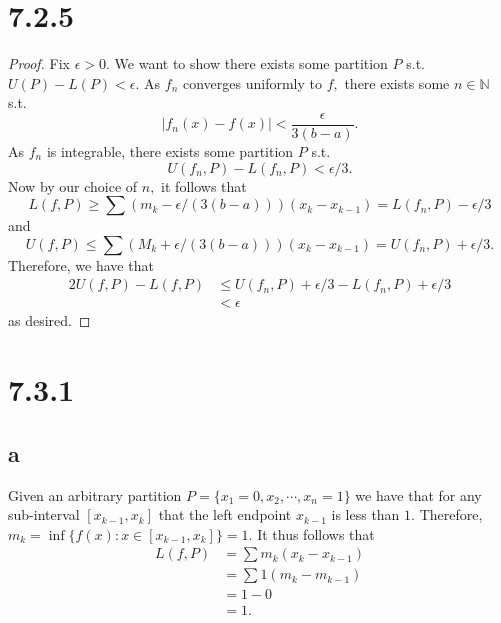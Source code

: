 \documentclass[10pt]{article}
\begin{document}
\section*{7.2.5}

\begin{proof}
    Fix $\epsilon > 0.$ We want to show there exists some partition $P$ s.t. $U(P)-L(P)<\epsilon.$ As $f_n$ converges uniformly to $f,$ there exists some $n\in\mathbb{N}$ s.t.
    \begin{equation*}
        |f_n(x)-f(x)|<\frac{\epsilon}{3(b-a)}.
    \end{equation*}
    As $f_n$ is integrable, there exists some partition $P$ s.t.
    \begin{equation*}
        U(f_n,P)-L(f_n,P)<\epsilon/3.
    \end{equation*}
    Now by our choice of $n,$ it follows that
    \begin{equation}
        L(f,P)\ge \sum (m_k-\epsilon/(3(b-a)))(x_k-x_{k-1}) =L(f_n,P)-\epsilon/3
    \end{equation}
    and
    \begin{equation}
        U(f,P)\le \sum (M_k+\epsilon/(3(b-a)))(x_k-x_{k-1})=U(f_n,P)+\epsilon/3.
    \end{equation}
    Therefore, we have that
    \begin{alignat*}{2}
        U(f,P)-L(f,P)&\le U(f_n,P)+\epsilon/3 - L(f_n,P)+\epsilon/3\\
        &<\epsilon
    \end{alignat*}
    as desired.
\end{proof}

\section*{7.3.1}

\subsection*{a}

Given an arbitrary partition $P=\{x_1=0, x_2,\cdots,x_n=1\}$ we have that for any sub-interval $[x_{k-1},x_{k}]$ that the left endpoint $x_{k-1}$ is less than $1.$ Therefore, $m_k=\inf\{f(x):x\in[x_{k-1},x_k]\}=1.$ It thus follows that
\begin{align*}
    L(f,P) &= \sum m_k (x_k-x_{k-1})\\
    &= \sum 1(m_k-m_{k-1})\\
    &= 1-0\\
    &= 1.
\end{align*}
\end{document}
